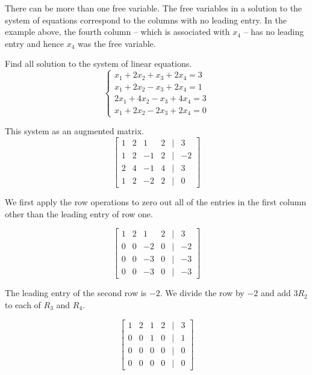 There can be more than one free variable. The free variables in a solution to the system of equations correspond to the columns with no leading entry. In the example above, the fourth column -- which is associated with \(x_4\) -- has no leading entry and hence \(x_4\) was the free variable.

\begin{example}
    Find all solution to the system of linear equations.
    \[\begin{cases}
        x_1 + 2x_2 + x_3 + 2x_4 = 3 \\
        x_1 + 2x_2 - x_3 + 2x_4 = 1 \\
        2x_1 + 4x_2 - x_3 + 4x_4 = 3 \\
        x_1 + 2x_2 - 2x_3 + 2x_4 = 0
    \end{cases}\]
    \begin{solution}
        This system as an augmented matrix.
        \[\begin{bmatrix}
            1 & 2 & 1 & 2 & \vert & 3 \\
            1 & 2 & -1 & 2 & \vert & -2 \\
            2 & 4 & -1 & 4 & \vert & 3 \\
            1 & 2 & -2 & 2 & \vert & 0
        \end{bmatrix}\]

        We first apply the row operations to zero out all of the entries in the first column other than the leading entry of row one.

        \[\begin{bmatrix}
            1 & 2 & 1 & 2 & \vert & 3 \\
            0 & 0 & -2 & 0 & \vert & -2 \\
            0 & 0 & -3 & 0 & \vert & -3 \\
            0 & 0 & -3 & 0 & \vert & -3
        \end{bmatrix}\]

        The leading entry of the second row is \(-2.\) We divide the row by \(-2\) and add \(3R_2\) to each of \(R_3\) and \(R_4.\)

        \[\begin{bmatrix}
            1 & 2 & 1 & 2 & \vert & 3 \\
            0 & 0 & 1 & 0 & \vert & 1 \\
            0 & 0 & 0 & 0 & \vert & 0 \\
            0 & 0 & 0 & 0 & \vert & 0
        \end{bmatrix}\]


\end{solution}
\end{example}
